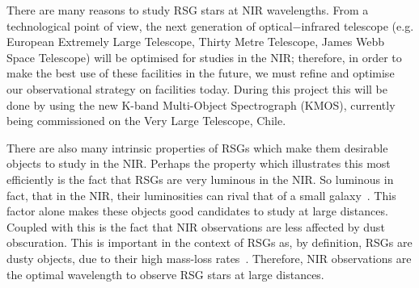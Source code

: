 \documentclass[a4paper,12pt]{article}
\begin{document}
There are many reasons to study RSG stars at NIR wavelengths.
From a technological point of view, the next generation of optical$-$infrared telescope (e.g. European Extremely Large Telescope, Thirty Metre Telescope, James Webb Space Telescope) will be optimised for studies in the NIR; therefore, in order to make the best use of these facilities in the future, we must refine and optimise our observational strategy on facilities today. 
During this project this will be done by using the new K-band Multi-Object Spectrograph (KMOS), currently being commissioned on the Very Large Telescope, Chile. 


There are also many intrinsic properties of RSGs which make them desirable objects to study in the NIR.
Perhaps the property which illustrates this most efficiently is the fact that RSGs are very luminous in the NIR.
So luminous in fact, that in the NIR, their luminosities can rival that of a small galaxy~\citep{Davies10}.
This factor alone makes these objects good candidates to study at large distances.
Coupled with this is the fact that NIR observations are less affected by dust obscuration. 
This is important in the context of RSGs as, by definition, RSGs are dusty objects, due to their high mass-loss rates~\citep[e.g.][]{Danchi94}.
Therefore, NIR observations are the optimal wavelength to observe RSG stars at large distances. 

\end{document}
